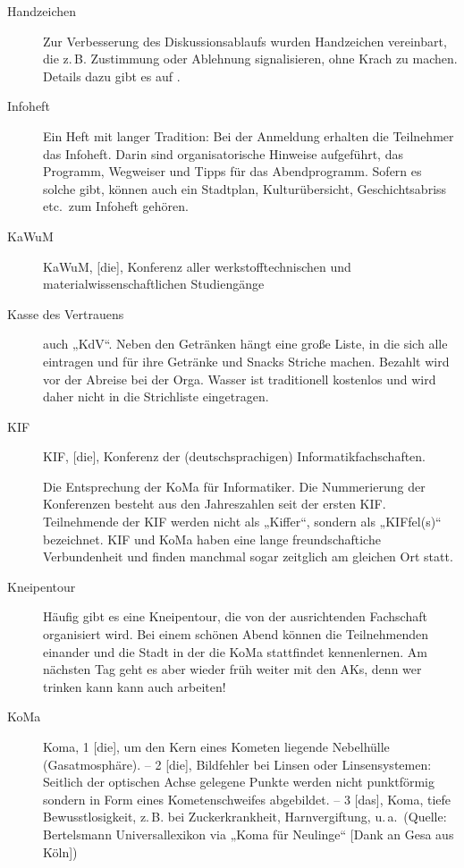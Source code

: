 \begin{description}
\item[Handzeichen]
    Zur Verbesserung des Diskussionsablaufs wurden Handzeichen vereinbart, die z.\,B. Zustimmung oder Ablehnung signalisieren, ohne Krach	zu machen. Details dazu gibt es auf .

\item[Infoheft]
    Ein Heft mit langer Tradition: Bei der Anmeldung erhalten die Teilnehmer das Infoheft. Darin sind organisatorische Hinweise aufgeführt, das Programm, Wegweiser und Tipps für das Abendprogramm. Sofern es solche gibt, können auch ein Stadtplan, Kulturübersicht,	Geschichtsabriss etc.\ zum Infoheft gehören.

\item[KaWuM]
    KaWuM, [die], Konferenz aller werkstofftechnischen und materialwissenschaftlichen Studiengänge

\item[Kasse des Vertrauens]
    auch „KdV“. Neben den Getränken hängt eine große Liste, in die sich alle eintragen und für ihre Getränke und Snacks Striche machen.  Bezahlt wird vor der Abreise bei der Orga.  Wasser ist traditionell kostenlos und wird daher nicht in die Strichliste eingetragen.	

\item[KIF]
    KIF, [die], Konferenz der (deutschsprachigen) Informatikfachschaften.

	Die Entsprechung der KoMa für Informatiker. Die Nummerierung der Konferenzen besteht aus den Jahreszahlen seit der ersten KIF. Teilnehmende der KIF werden nicht als „Kiffer“, sondern als „KIFfel(s)“ bezeichnet. KIF und KoMa haben eine lange freundschaftiche Verbundenheit und finden manchmal sogar zeitglich am gleichen Ort statt.

\item[Kneipentour]
    Häufig gibt es eine Kneipentour, die von der ausrichtenden Fachschaft organisiert wird. Bei einem schönen Abend können die Teilnehmenden einander und die Stadt in der die KoMa stattfindet kennenlernen. Am nächsten Tag geht es aber wieder früh weiter mit den AKs, denn wer trinken kann kann auch arbeiten!

\item[KoMa]
    Koma, 1 [die], um den Kern eines Kometen liegende Nebelhülle (Gasatmosphäre). -- 2 [die], Bildfehler bei Linsen oder Linsensystemen: Seitlich der optischen Achse gelegene Punkte werden nicht punktförmig sondern in Form eines Kometenschweifes abgebildet. -- 3 [das], Koma, tiefe Bewusstlosigkeit, z.\,B. bei Zuckerkrankheit, Harnvergiftung, u.\,a.\ (Quelle: Bertelsmann Universallexikon via „Koma für Neulinge“ [Dank an Gesa aus Köln])


\end{description}
